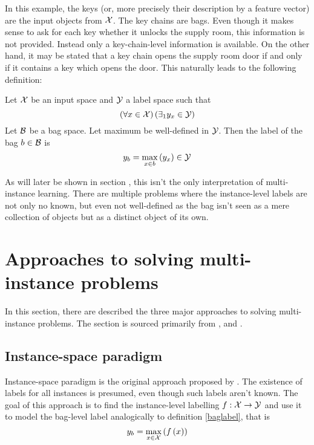 In this example, the keys (or, more precisely their description by a feature vector) are the input objects from \( \mathcal{X} \). The key chains are bags. Even though it makes sense to ask for each key whether it unlocks the supply room, this information is not provided. Instead only a key-chain-level information is available. On the other hand, it may be stated that a key chain opens the supply room door if and only if it contains a key which opens the door. This naturally leads to the following definition:

\begin{define}\label{baglabel}
	Let \( \mathcal{X} \) be an input space and \( \mathcal{Y} \) a label space such that
	\[ \left( \forall x \in \mathcal{X} \right) \left( \exists_1 y_x \in \mathcal{Y} \right) \]
	Let \( \mathcal{B} \) be a bag space. Let maximum be well-defined in \( \mathcal{Y} \). Then the label of the bag \( b \in \mathcal{B} \) is
	\[ y_b = \max_{x \in b} \left( y_x \right) \in \mathcal{Y} \]
\end{define}

As will later be shown in section , this isn't the only interpretation of multi-instance learning. There are multiple problems  where the instance-level labels are not only no known, but even not well-defined as the bag isn't seen as a mere collection of objects but as a distinct object of its own.

\section{Approaches to solving multi-instance problems}
In this section, there are described the three major approaches to solving multi-instance problems. The section is sourced primarily from \cite{pevny_using_2017}, \cite{pevny_discriminative_2016} and \cite{amores_multiple_2013}. 

\subsection{Instance-space paradigm}
Instance-space paradigm is the original approach proposed by \cite{dietterich_solving_1997}. The existence of labels for all instances is presumed, even though such labels aren't known. The goal of this approach is to find the instance-level labelling \( f : \mathcal{X} \to \mathcal{Y} \) and use it to model the bag-level label analogically to definition \ref{baglabel}, that is
\[ y_b = \max_{x \in \mathcal{X} } \left( f \left( x \right) \right) \]

